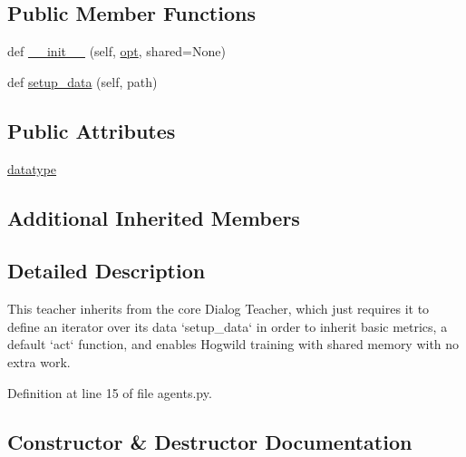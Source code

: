 \subsection*{Public Member Functions}
\begin{DoxyCompactItemize}
\item 
def \hyperlink{classparlai_1_1tasks_1_1ubuntu_1_1agents_1_1UbuntuTeacher_aa5a556a3369c3b20101179c6e3f63c2a}{\+\_\+\+\_\+init\+\_\+\+\_\+} (self, \hyperlink{classparlai_1_1core_1_1agents_1_1Teacher_a3ce6243860ce978a897922863ed32fa4}{opt}, shared=None)
\item 
def \hyperlink{classparlai_1_1tasks_1_1ubuntu_1_1agents_1_1UbuntuTeacher_ac8386ce4d46f4d3e8b296ac291ff4997}{setup\+\_\+data} (self, path)
\end{DoxyCompactItemize}
\subsection*{Public Attributes}
\begin{DoxyCompactItemize}
\item 
\hyperlink{classparlai_1_1tasks_1_1ubuntu_1_1agents_1_1UbuntuTeacher_ae664115e7a564e2a816adc8ecc6ea831}{datatype}
\end{DoxyCompactItemize}
\subsection*{Additional Inherited Members}


\subsection{Detailed Description}
\begin{DoxyVerb}This teacher inherits from the core Dialog Teacher, which just
requires it to define an iterator over its data `setup_data` in order to
inherit basic metrics, a default `act` function, and enables
Hogwild training with shared memory with no extra work.
\end{DoxyVerb}
 

Definition at line 15 of file agents.\+py.



\subsection{Constructor \& Destructor Documentation}
\mbox{\label{classparlai_1_1tasks_1_1ubuntu_1_1agents_1_1UbuntuTeacher_aa5a556a3369c3b20101179c6e3f63c2a}} 
